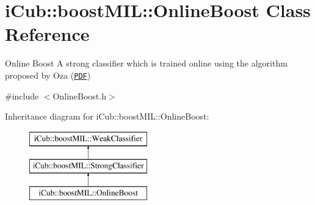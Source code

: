 \section{i\+Cub\+:\+:boost\+M\+I\+L\+:\+:Online\+Boost Class Reference}
\label{classiCub_1_1boostMIL_1_1OnlineBoost}


Online Boost A strong classifier which is trained online using the algorithm proposed by Oza (\href{http://ti.arc.nasa.gov/m/profile/oza/b2hd-oza05.html}{\tt P\+D\+F})  




{\ttfamily \#include $<$Online\+Boost.\+h$>$}

Inheritance diagram for i\+Cub\+:\+:boost\+M\+I\+L\+:\+:Online\+Boost\+:\begin{figure}[H]
\begin{center}
\leavevmode
\includegraphics[height=3.000000cm]{classiCub_1_1boostMIL_1_1OnlineBoost}
\end{center}
\end{figure}
